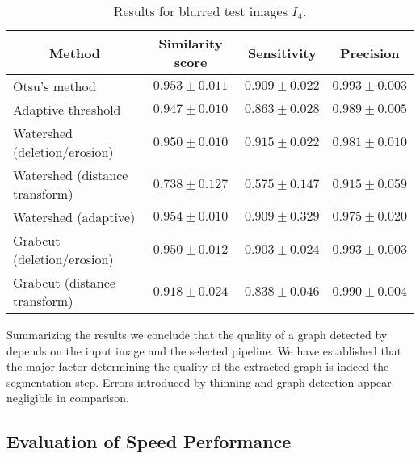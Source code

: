 		\begin{table}
			\centering
			\begin{tabular}{@{} l *3c @{}}
			\toprule
			\multicolumn{1}{c}{Method}    & Similarity score  & Sensitivity  & Precision \\ 
			\midrule
			Otsu's method                   & $0.953 \pm 0.011$ & $0.909 \pm 0.022$ & $0.993 \pm 0.003$ \\
			Adaptive threshold              & $0.947 \pm 0.010$ & $0.863 \pm 0.028$ & $0.989 \pm 0.005$ \\
			Watershed (deletion/erosion)    & $0.950 \pm 0.010$ & $0.915 \pm 0.022$ & $0.981 \pm 0.010$ \\
			Watershed (distance transform)  & $0.738 \pm 0.127$ & $0.575 \pm 0.147$ & $0.915 \pm 0.059$ \\
			Watershed (adaptive)            & $0.954 \pm 0.010$ & $0.909 \pm 0.329$ & $0.975 \pm 0.020$ \\
			Grabcut (deletion/erosion)      & $0.950 \pm 0.012$ & $0.903 \pm 0.024$ & $0.993 \pm 0.003$ \\
			Grabcut (distance transform)    & $0.918 \pm 0.024$ & $0.838 \pm 0.046$ & $0.990 \pm 0.004$ \\
			\bottomrule
			\end{tabular}
			\caption[\NEFIs evaluation - Images with a blur]{Results for blurred test images $I_4$.}
			\label{tab:blur}
		\end{table}

		Summarizing the results we conclude that the quality of a graph detected by \NEFI depends on the input image and the selected pipeline. We have established that the major factor determining the quality of the extracted graph is indeed the segmentation step. Errors introduced by thinning and graph detection appear negligible in comparison. 


	\subsection{Evaluation of Speed Performance}

